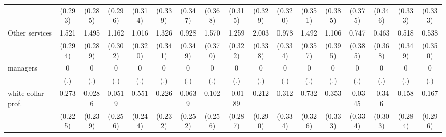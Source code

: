 {\begin{tabular}{l*{16}{c}}
                    &     (0.293)         &     (0.285)         &     (0.296)         &     (0.314)         &     (0.339)         &     (0.347)         &     (0.368)         &     (0.315)         &     (0.329)         &     (0.320)         &     (0.351)         &     (0.385)         &     (0.375)         &     (0.346)         &     (0.333)         &     (0.333)         \\
[1em]
Other services      &       1.521\sym{***}&       1.495\sym{***}&       1.162\sym{***}&       1.016\sym{**} &       1.326\sym{***}&       0.928\sym{**} &       1.570\sym{***}&       1.259\sym{***}&       2.003\sym{***}&       0.978\sym{**} &       1.492\sym{***}&       1.106\sym{**} &       0.747         &       0.463         &       0.518         &       0.538         \\
                    &     (0.294)         &     (0.289)         &     (0.302)         &     (0.320)         &     (0.341)         &     (0.349)         &     (0.370)         &     (0.322)         &     (0.338)         &     (0.334)         &     (0.357)         &     (0.395)         &     (0.385)         &     (0.368)         &     (0.349)         &     (0.350)         \\
[1em]
managers            &           0         &           0         &           0         &           0         &           0         &           0         &           0         &           0         &           0         &           0         &           0         &           0         &           0         &           0         &           0         &           0         \\
                    &         (.)         &         (.)         &         (.)         &         (.)         &         (.)         &         (.)         &         (.)         &         (.)         &         (.)         &         (.)         &         (.)         &         (.)         &         (.)         &         (.)         &         (.)         &         (.)         \\
[1em]
white collar - prof.&       0.273         &      0.0286         &      0.0519         &       0.551\sym{*}  &       0.226         &      0.0639         &       0.102         &     -0.0189         &       0.212         &       0.312         &       0.732\sym{*}  &       0.353         &     -0.0345         &      -0.346         &       0.158         &       0.167         \\
                    &     (0.225)         &     (0.239)         &     (0.256)         &     (0.244)         &     (0.232)         &     (0.252)         &     (0.256)         &     (0.287)         &     (0.290)         &     (0.334)         &     (0.326)         &     (0.333)         &     (0.334)         &     (0.303)         &     (0.284)         &     (0.296)         \\

\end{tabular}}
